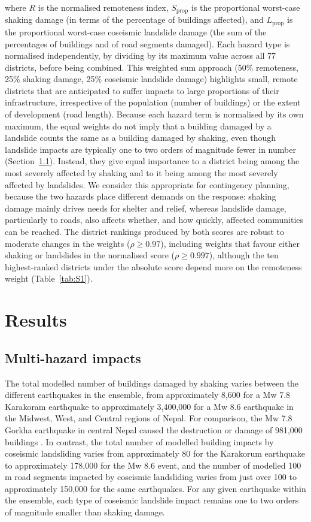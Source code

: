 \documentclass[preprint,12pt,authoryear]{elsarticle}
\begin{document}
where $R$ is the normalised remoteness index, $S_{\text{prop}}$ is the proportional worst-case shaking damage (in terms of the percentage of buildings affected), and $L_{\text{prop}}$ is the proportional worst-case coseismic landslide damage (the sum of the percentages of buildings and of road segments damaged). Each hazard type is normalised independently, by dividing by its maximum value across all 77 districts, before being combined. This weighted sum approach (50\% remoteness, 25\% shaking damage, 25\% coseismic landslide damage) highlights small, remote districts that are anticipated to suffer impacts to large proportions of their infrastructure, irrespective of the population (number of buildings) or the extent of development (road length). Because each hazard term is normalised by its own maximum, the equal weights do not imply that a building damaged by a landslide counts the same as a building damaged by shaking, even though landslide impacts are typically one to two orders of magnitude fewer in number (Section~\ref{sec:results_impacts}). Instead, they give equal importance to a district being among the most severely affected by shaking and to it being among the most severely affected by landslides. We consider this appropriate for contingency planning, because the two hazards place different demands on the response: shaking damage mainly drives needs for shelter and relief, whereas landslide damage, particularly to roads, also affects whether, and how quickly, affected communities can be reached. The district rankings produced by both scores are robust to moderate changes in the weights ($\rho \geq 0.97$), including weights that favour either shaking or landslides in the normalised score ($\rho \geq 0.997$), although the ten highest-ranked districts under the absolute score depend more on the remoteness weight (Table~\ref{tab:S1}).

\section{Results}

\subsection{Multi-hazard impacts}
\label{sec:results_impacts}

The total modelled number of buildings damaged by shaking varies between the different earthquakes in the ensemble, from approximately 8,600 for a Mw 7.8 Karakoram earthquake to approximately 3,400,000 for a Mw 8.6 earthquake in the Midwest, West, and Central regions of Nepal. For comparison, the Mw 7.8 Gorkha earthquake in central Nepal caused the destruction or damage of 981,000 buildings \citep{NationalPlanningCommission2015}. In contrast, the total number of modelled building impacts by coseismic landsliding varies from approximately 80 for the Karakorum earthquake to approximately 178,000 for the Mw 8.6 event, and the number of modelled 100 m road segments impacted by coseismic landsliding varies from just over 100 to approximately 150,000 for the same earthquakes. For any given earthquake within the ensemble, each type of coseismic landslide impact remains one to two orders of magnitude smaller than shaking damage.
\end{document}
